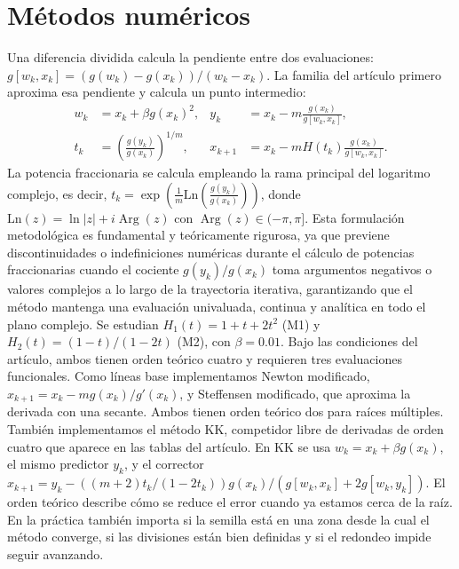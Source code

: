 \documentclass[10pt,a4paper]{article}
\begin{document}
\section{M\'etodos num\'ericos}
Una diferencia dividida calcula la pendiente entre dos evaluaciones: $g[w_k,x_k]=(g(w_k)-g(x_k))/(w_k-x_k)$. La familia del art\'iculo primero aproxima esa pendiente y calcula un punto intermedio:
\begin{align*}w_k&=x_k+\beta g(x_k)^2,& y_k&=x_k-m\frac{g(x_k)}{g[w_k,x_k]},\\t_k&=\left(\frac{g(y_k)}{g(x_k)}\right)^{1/m},&x_{k+1}&=x_k-mH(t_k)\frac{g(x_k)}{g[w_k,x_k]} .\end{align*}
La potencia fraccionaria se calcula empleando la rama principal del logaritmo complejo, es decir, $t_k = \exp\left(\frac{1}{m}\mathrm{Ln}\left(\frac{g(y_k)}{g(x_k)}\right)\right)$, donde $\mathrm{Ln}(z) = \ln|z| + i\operatorname{Arg}(z)$ con $\operatorname{Arg}(z)\in(-\pi,\pi]$. Esta formulaci\'on metodol\'ogica es fundamental y te\'oricamente rigurosa, ya que previene discontinuidades o indefiniciones num\'ericas durante el c\'alculo de potencias fraccionarias cuando el cociente $g(y_k)/g(x_k)$ toma argumentos negativos o valores complejos a lo largo de la trayectoria iterativa, garantizando que el m\'etodo mantenga una evaluaci\'on univaluada, continua y anal\'itica en todo el plano complejo.
Se estudian $H_1(t)=1+t+2t^2$ (M1) y $H_2(t)=(1-t)/(1-2t)$ (M2), con $\beta=0.01$. Bajo las condiciones del art\'iculo, ambos tienen orden te\'orico cuatro y requieren tres evaluaciones funcionales. Como l\'ineas base implementamos Newton modificado, $x_{k+1}=x_k-mg(x_k)/g'(x_k)$, y Steffensen modificado, que aproxima la derivada con una secante. Ambos tienen orden te\'orico dos para ra\'ices m\'ultiples. También implementamos el m\'etodo KK, competidor libre de derivadas de orden cuatro que aparece en las tablas del art\'iculo. En KK se usa $w_k=x_k+\beta g(x_k)$, el mismo predictor $y_k$, y el corrector $x_{k+1}=y_k-((m+2)t_k/(1-2t_k))g(x_k)/(g[w_k,x_k]+2g[w_k,y_k])$.
El orden te\'orico describe cómo se reduce el error cuando ya estamos cerca de la ra\'iz. En la práctica tambi\'en importa si la semilla está en una zona desde la cual el m\'etodo converge, si las divisiones están bien definidas y si el redondeo impide seguir avanzando.
\end{document}
